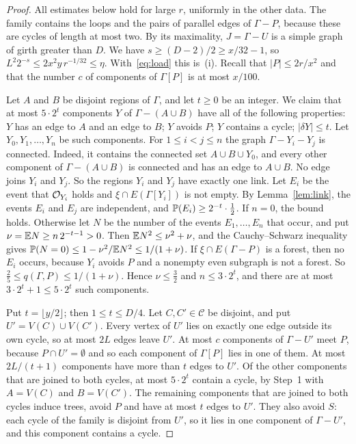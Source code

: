 \documentclass[11pt]{article}
\begin{document}
\begin{proof}
All estimates below hold for large $r$, uniformly in the other data. The family contains the
loops and the pairs of parallel edges of $\Gamma-P$, because these are cycles of length at most
two. By its maximality, $J=\Gamma-U$ is a simple graph of girth greater than $D$. We have
$s\ge(D-2)/2\ge x/32-1$, so $L^{2}2^{-s}\le2x^{2}y\,r^{-1/32}\le\eta$. With~\eqref{eq:load} this
is~(i). Recall that $|P|\le2r/x^{2}$ and that the number $c$ of components of $\Gamma[P]$ is at
most $x/100$.

 Let $A$ and $B$ be disjoint regions of $\Gamma$, and let
$t\ge0$ be an integer. We claim that at most $5\cdot2^{t}$ components $Y$ of $\Gamma-(A\cup B)$
have all of the following properties: $Y$ has an edge to $A$ and an edge to $B$; $Y$ avoids $P$;
$Y$ contains a cycle; $|\delta Y|\le t$. Let $Y_0,Y_1,\dots,Y_n$ be such components. For
$1\le i<j\le n$ the graph $\Gamma-Y_i-Y_j$ is connected. Indeed, it contains the connected set
$A\cup B\cup Y_0$, and every other component of $\Gamma-(A\cup B)$ is connected and has an edge to
$A\cup B$. No edge joins $Y_i$ and $Y_j$. So the regions $Y_i$ and $Y_j$ have exactly one link.
Let $E_i$ be the event that $\mathcal{O}_{Y_i}$ holds and $\xi\cap E(\Gamma[Y_i])$ is not empty. By
Lemma~\ref{lem:link}, the events $E_i$ and $E_j$ are independent, and
$\mathbb{P}(E_i)\ge2^{-t}\cdot\tfrac12$. If $n=0$, the bound holds. Otherwise let $N$ be the number of the
events $E_1,\dots,E_n$ that occur, and put $\nu=\mathbb{E} N\ge n\,2^{-t-1}>0$. Then
$\mathbb{E} N^{2}\le\nu^{2}+\nu$, and the Cauchy--Schwarz inequality gives
$\mathbb{P}(N=0)\le1-\nu^{2}/\mathbb{E} N^{2}\le1/(1+\nu)$. If $\xi\cap E(\Gamma-P)$ is a forest, then no $E_i$
occurs, because $Y_i$ avoids $P$ and a nonempty even subgraph is not a forest. So
$\frac25\le q(\Gamma,P)\le1/(1+\nu)$. Hence $\nu\le\frac32$ and $n\le3\cdot2^{t}$, and there are
at most $3\cdot2^{t}+1\le5\cdot2^{t}$ such components.

 Put $t=\lfloor y/2\rfloor$; then $1\le t\le D/4$. Let
$C,C'\in\mathcal C$ be disjoint, and put $U'=V(C)\cup V(C')$. Every vertex of $U'$ lies on exactly
one edge outside its own cycle, so at most $2L$ edges leave $U'$. At most $c$ components of
$\Gamma-U'$ meet $P$, because $P\cap U'=\emptyset$ and so each component of $\Gamma[P]$ lies in one
of them. At most $2L/(t+1)$ components have more than $t$ edges to $U'$. Of the other components
that are joined to both cycles, at most $5\cdot2^{t}$ contain a cycle, by Step~1 with $A=V(C)$
and $B=V(C')$. The remaining components that are joined to both cycles induce trees, avoid $P$
and have at most $t$ edges to $U'$. They also avoid $S$: each cycle of the family is disjoint
from $U'$, so it lies in one component of $\Gamma-U'$, and this component contains a cycle.


\end{proof}
\end{document}
